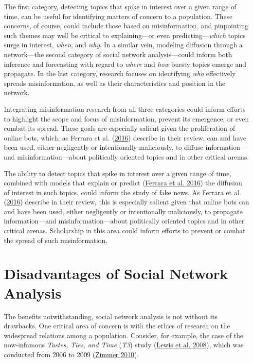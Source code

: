 \documentclass{book}
\begin{document}
The first category, detecting topics that spike in interest over a given range
of time, can be useful for identifying matters of concern to a population.
These concerns, of course, could include those based on misinformation, and
pinpointing such themes may well be critical to explaining---or even
predicting---\emph{which} topics surge in interest, \emph{when}, and
\emph{why}. In a similar vein, modeling diffusion through a network---the
second category of social network analysis---could inform both inference and
forecasting with regard to \emph{where} and \emph{how} bursty topics emerge
and propagate. In the last category, research focuses on identifying
\emph{who} effectively spreads misinformation, as well as their
characteristics and position in the network.

Integrating misinformation research from all three categories could inform
efforts to highlight the scope and focus of misinformation, prevent its
emergence, or even combat its spread. These goals are especially salient given
the proliferation of online bots, which, as Ferrara et al.
(\protect\hyperlink{ref-FerraraEtAl2016}{2016}) describe in their review, can
and have been used, either negligently or intentionally maliciously, to
diffuse information---and misinformation---about politically oriented topics
and in other critical arenas.

The ability to detect topics that spike in interest over a given range of
time, combined with models that explain or predict
(\protect\hyperlink{ref-FerraraEtAl2016}{Ferrara et al. 2016}) the diffusion
of interest in such topics, could inform the study of fake news. As Ferrara et
al. (\protect\hyperlink{ref-FerraraEtAl2016}{2016}) describe in their review,
this is especially salient given that online bots can and have been used,
either negligently or intentionally maliciously, to propagate
information---and misinformation---about politically oriented topics and in
other critical arenas. Scholarship in this area could inform efforts to
prevent or combat the spread of such misinformation.

\hypertarget{disadvantages-of-social-network-analysis}{%
\section{Disadvantages of Social Network
Analysis}\label{disadvantages-of-social-network-analysis}}

The benefits notwithstanding, social network analysis is not without its
drawbacks. One critical area of concern is with the ethics of research on the
widespread relations among a population. Consider, for example, the case of
the now-infamous \emph{Tastes, Ties, and Time} (\emph{T3}) study
(\protect\hyperlink{ref-LewisEtAl2008}{Lewis et al. 2008}), which was
conducted from 2006 to 2009 (\protect\hyperlink{ref-Zimmer2010}{Zimmer 2010}).
\end{document}
